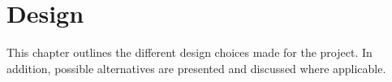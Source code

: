 \chapter{Design}
This chapter outlines the different design choices made for the project. In addition, possible alternatives are presented and discussed where applicable.